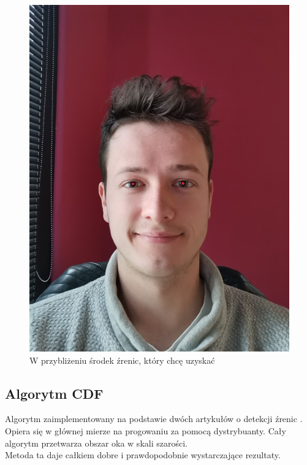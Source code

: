 \documentclass[10pt, a4paper]{article}
\begin{document}
\begin{figure}[H]
    \begin{center}
        \includegraphics[scale=0.35]{images/expected_pupils.jpg}
        \caption{W przybliżeniu środek źrenic, który chcę uzyskać}
        \label{fig:expected_pupils}
    \end{center}
\end{figure}

\subsection{Algorytm CDF}
Algorytm zaimplementowany na podstawie dwóch artykułów o detekcji źrenic \cite{IMECSPupilCDFAnalysis}
\cite{EyePupilWebCam}. Opiera się w głównej mierze na progowaniu za pomocą dystrybuanty. Cały algorytm przetwarza obszar oka w skali szarości. \\
Metoda ta daje całkiem dobre i prawdopodobnie wystarczające rezultaty. \\
\end{document}
